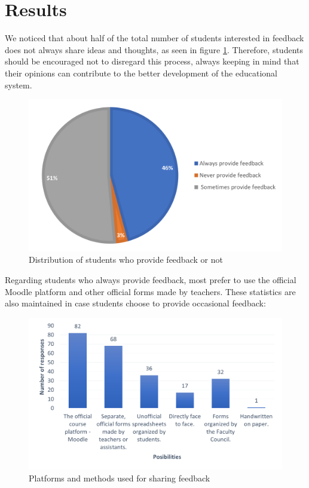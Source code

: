 \section{Results} \label{3:results}

    We noticed that about half of the total number of students interested in feedback does not always share ideas and thoughts, as seen in figure \ref{3:fig:feedback_distribution}. Therefore, students should be encouraged not to disregard this process, always keeping in mind that their opinions can contribute to the better development of the educational system.
    
    \begin{figure}[ht]
        \centering
             \includegraphics[height=0.25\textheight]{figures/charts/survey/feedback_distribution.png}
        \caption{Distribution of students who provide feedback or not}
        \label{3:fig:feedback_distribution}
    \end{figure}
    
    Regarding students who always provide feedback, most prefer to use the official Moodle platform and other official forms made by teachers. These statistics are also maintained in case students choose to provide occasional feedback:
    
    \clearpage
    
    \begin{figure}[ht]
        \centering
             \includegraphics[height=0.322\textheight]{figures/charts/survey/feedback_platforms.png}
        \caption{Platforms and methods used for sharing feedback}
        \label{3:fig:feedback_platforms}
    \end{figure}
    
